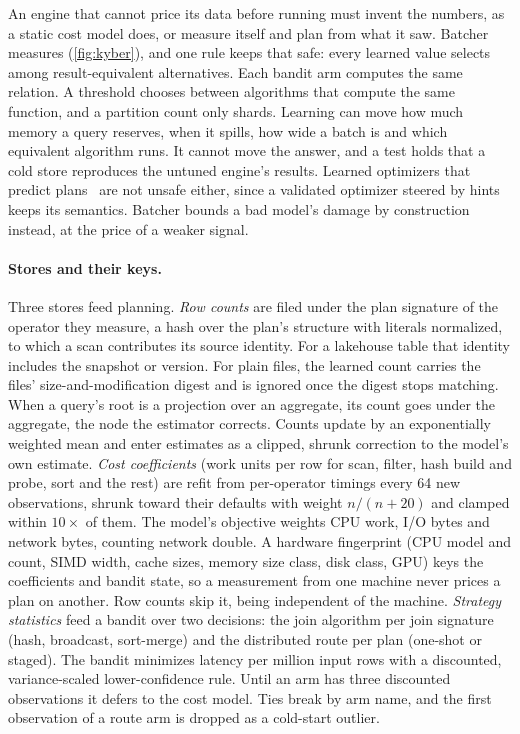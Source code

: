\documentclass[10pt,twocolumn,letterpaper]{article}   %
\newcommand{\sys}{Batcher}
\begin{document}
An engine that cannot price its data before running must invent the numbers, as a static cost
model does, or measure itself and plan from what it saw. \sys{} measures (\cref{fig:kyber}), and one rule keeps
that safe: every learned value selects among result-equivalent alternatives. Each
bandit arm computes the same relation. A threshold chooses between algorithms that compute the
same function, and a partition count only shards. Learning can move how much memory a query
reserves, when it spills, how wide a batch is and which equivalent algorithm runs. It cannot
move the answer, and a test holds that a cold store reproduces the untuned engine's results.
Learned optimizers that predict plans~\cite{marcus2019neo,marcus2021bao,kipf2019learned} are
not unsafe either, since a validated optimizer steered by hints keeps its semantics. \sys{}
bounds a bad model's damage by construction instead, at the price of a weaker signal.

\paragraph{Stores and their keys.} Three stores feed planning. \emph{Row counts} are filed
under the plan signature of the operator they measure, a hash over the plan's structure with
literals normalized, to which a scan contributes its source identity. For a lakehouse table
that identity includes the snapshot or version. For plain files, the learned count carries the
files' size-and-modification digest and is ignored once the digest stops matching. When a
query's root is a projection over an aggregate, its count goes under the aggregate, the node
the estimator corrects. Counts update by an exponentially weighted mean and enter estimates as
a clipped, shrunk correction to the model's own estimate. \emph{Cost coefficients} (work units
per row for scan, filter, hash build and probe, sort and the rest) are refit from per-operator
timings every 64 new observations, shrunk toward their defaults with weight $n/(n+20)$ and
clamped within $10\times$ of them. The model's objective weights CPU work, I/O bytes and
network bytes, counting network double. A hardware fingerprint (CPU model and count, SIMD
width, cache sizes, memory size class, disk class, GPU) keys the coefficients and bandit state,
so a measurement from one machine never prices a plan on another. Row counts skip it, being
independent of the machine. \emph{Strategy statistics} feed a
bandit over two decisions: the join algorithm per join signature (hash, broadcast, sort-merge)
and the distributed route per plan (one-shot or staged). The bandit minimizes latency per
million input rows with a discounted, variance-scaled lower-confidence rule. Until an arm has
three discounted observations it defers to the cost model. Ties break by arm name, and the
first observation of a route arm is dropped as a cold-start outlier.
\end{document}
